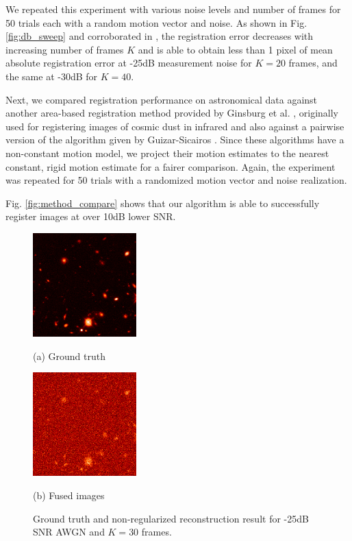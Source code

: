 \documentclass{article}
\begin{document}
We repeated this experiment with various noise levels and number of frames for 50 trials each with a random motion vector and noise.  As shown in Fig. \ref{fig:db_sweep} and corroborated in \cite{gratadour2005sub}, the registration error decreases with increasing number of frames $K$ and is able to obtain less than 1 pixel of mean absolute registration error at -25dB measurement noise for $K=20$ frames, and the same at -30dB for $K=40$.

Next, we compared registration performance on astronomical data against another area-based registration method provided by Ginsburg et al. \cite{ginsburg2013bolocam}, originally used for registering images of cosmic dust in infrared and also against a pairwise version of the algorithm given by Guizar-Sicairos \cite{guizar2008efficient}.  Since these algorithms have a non-constant motion model, we project their motion estimates to the nearest constant, rigid motion estimate for a fairer comparison.  Again, the experiment was repeated for 50 trials with a randomized motion vector and noise realization.

Fig. \ref{fig:method_compare} shows that our algorithm is able to successfully register images at over 10dB lower SNR.


\begin{figure}[htb]
\begin{minipage}[b]{.48\linewidth}
  \centering
  \centerline{\includegraphics[width=4.0cm]{images/recon_clean.png}}
  \centerline{(a) Ground truth}\medskip
\end{minipage}
\hfill
\begin{minipage}[b]{0.48\linewidth}
  \centering
  \centerline{\includegraphics[width=4.0cm]{images/recon.png}}
  \centerline{(b) Fused images}\medskip
\end{minipage}
  \caption{Ground truth and non-regularized reconstruction result for -25dB SNR AWGN and $K=30$ frames.}
\label{fig:recon}
\end{figure}
\end{document}

